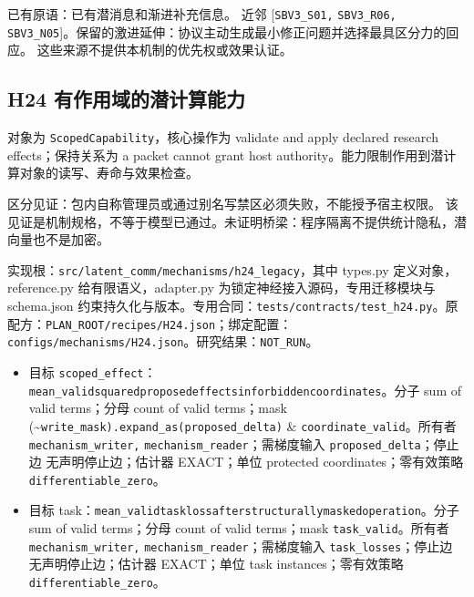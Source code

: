 \documentclass[
  10pt,
]{article}
\begin{document}
已有原语：已有潜消息和渐进补充信息。 近邻 {[}\nolinkurl{SBV3_S01,}
\nolinkurl{SBV3_R06,}
\nolinkurl{SBV3_N05}{]}。保留的激进延伸：协议主动生成最小修正问题并选择最具区分力的回应。
这些来源不提供本机制的优先权或效果认证。

\subsection{H24
有作用域的潜计算能力}\label{h24-ux6709ux4f5cux7528ux57dfux7684ux6f5cux8ba1ux7b97ux80fdux529b}

对象为 \nolinkurl{ScopedCapability}，核心操作为 validate and apply
declared research effects；保持关系为 a packet cannot grant host
authority。能力限制作用到潜计算对象的读写、寿命与效果检查。

区分见证：包内自称管理员或通过别名写禁区必须失败，不能授予宿主权限。
该见证是机制规格，不等于模型已通过。未证明桥梁：程序隔离不提供统计隐私，潜向量也不是加密。

实现根：{\small\nolinkurl{src/latent_comm/mechanisms/h24_legacy}}，其中
types.py 定义对象，reference.py 给有限语义，adapter.py
为锁定神经接入源码，专用迁移模块与 schema.json
约束持久化与版本。专用合同：{\small\nolinkurl{tests/contracts/test_h24.py}}。原配方：{\small\nolinkurl{PLAN_ROOT/recipes/H24.json}}；绑定配置：{\small\nolinkurl{configs/mechanisms/H24.json}}。研究结果：\nolinkurl{NOT_RUN}。

\begin{itemize}
\item
  目标
  \nolinkurl{scoped_effect}：{\small\nolinkurl{mean_valid}\hspace{0.333em}\nolinkurl{squared}\hspace{0.333em}\nolinkurl{proposed}\hspace{0.333em}\nolinkurl{effects}\hspace{0.333em}\nolinkurl{in}\hspace{0.333em}\nolinkurl{forbidden}\hspace{0.333em}\nolinkurl{coordinates}}。分子
  sum of valid terms；分母 count of valid terms；mask
  (\textasciitilde{}\nolinkurl{write_mask).expand_as(proposed_delta)} \&
  \nolinkurl{coordinate_valid}。所有者 \nolinkurl{mechanism_writer,}
  \nolinkurl{mechanism_reader}；需梯度输入
  \nolinkurl{proposed_delta}；停止边 无声明停止边；估计器 EXACT；单位
  protected coordinates；零有效策略 \nolinkurl{differentiable_zero}。
\item
  目标
  task：{\small\nolinkurl{mean_valid}\hspace{0.333em}\nolinkurl{task}\hspace{0.333em}\nolinkurl{loss}\hspace{0.333em}\nolinkurl{after}\hspace{0.333em}\nolinkurl{structurally}\hspace{0.333em}\nolinkurl{masked}\hspace{0.333em}\nolinkurl{operation}}。分子
  sum of valid terms；分母 count of valid terms；mask
  \nolinkurl{task_valid}。所有者 \nolinkurl{mechanism_writer,}
  \nolinkurl{mechanism_reader}；需梯度输入
  \nolinkurl{task_losses}；停止边 无声明停止边；估计器 EXACT；单位 task
  instances；零有效策略 \nolinkurl{differentiable_zero}。
\end{itemize}
\end{document}
